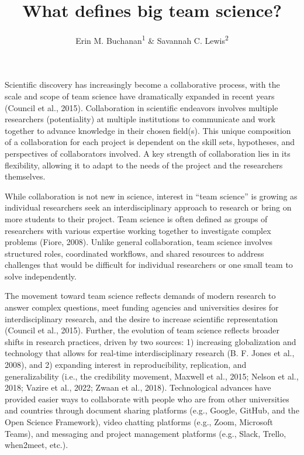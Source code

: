 \documentclass[
  man,floatsintext]{apa7}
\title{What defines big team science?}
\author{Erin M. Buchanan\textsuperscript{1} \& Savannah C. Lewis\textsuperscript{2}}
\date{}
\affiliation{\vspace{0.5cm}\textsuperscript{1} Harrisburg University of Science and Technology\\\textsuperscript{2} University of Alabama}
\begin{document}
\maketitle

Scientific discovery has increasingly become a collaborative process,
with the scale and scope of team science have dramatically expanded in
recent years (Council et al., 2015). Collaboration in scientific endeavors
involves multiple researchers (potentiality) at multiple institutions to
communicate and work together to advance knowledge in their chosen
field(s). This unique composition of a collaboration for each project is
dependent on the skill sets, hypotheses, and perspectives of collaborators
involved. A key strength of collaboration lies in its flexibility, allowing it
to adapt to the needs of the project and the researchers themselves.

While collaboration is not new in science, interest in ``team science'' is
growing as individual researchers seek an interdisciplinary approach to
research or bring on more students to their project. Team science is
often defined as groups of researchers with various expertise working
together to investigate complex problems (Fiore, 2008). Unlike general
collaboration, team science involves structured roles, coordinated
workflows, and shared resources to address challenges that would be
difficult for individual researchers or one small team to solve
independently.

The movement toward team science reflects demands of modern research to
answer complex questions, meet funding agencies and universities desires for
interdisciplinary research, and the desire to increase scientific representation
(Council et al., 2015). Further, the evolution of team science reflects broader shifts
in research practices, driven by two sources: 1) increasing globalization
and technology that allows for real-time interdisciplinary research (B. F. Jones et al., 2008), and 2) expanding interest in reproducibility, replication,
and generalizability (i.e., the credibility movement, Maxwell et al., 2015; Nelson et al., 2018; Vazire et al., 2022; Zwaan et al., 2018). Technological advances have provided easier ways to
collaborate with people who are from other universities and countries
through document sharing platforms (e.g., Google, GitHub, and the Open
Science Framework), video chatting platforms (e.g., Zoom, Microsoft
Teams), and messaging and project management platforms (e.g., Slack,
Trello, when2meet, etc.).
\end{document}
